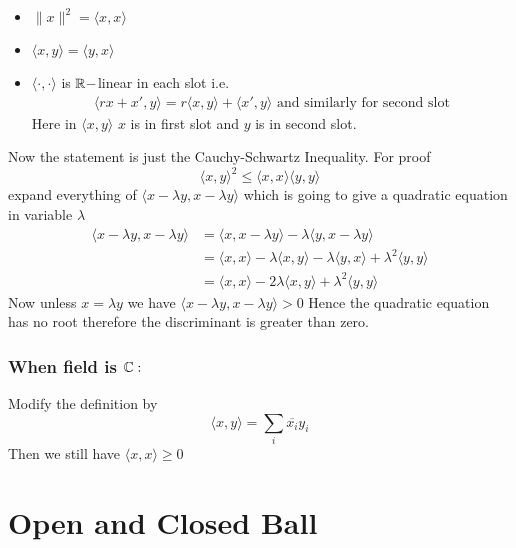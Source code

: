 {	\begin{note}
		\begin{itemize}
			\item $\|x\|^2=\langle x,x\rangle$
			\item $\langle x,y\rangle=\langle y,x\rangle$
			\item $\langle \cdot,\cdot\rangle$ is $\mathbb{R}-$linear in each slot i.e. \begin{align*}
				      \langle rx+x',y\rangle=r\langle x,y\rangle+\langle x',y\rangle	\text{ and similarly for second slot}
			      \end{align*}Here in $\langle x,y\rangle$ $x$ is in first slot and $y$ is in second slot.
		\end{itemize}
	\end{note}Now the statement is just the Cauchy-Schwartz Inequality. For proof $$\langle x,y\rangle^2\leq \langle x,x\rangle\langle y,y\rangle $$ expand everything of $\langle x-\lambda y,x-\lambda y\rangle$ which is going to give a quadratic equation in variable $\lambda $ \begin{align*}
		\langle x-\lambda y,x-\lambda y\rangle & =\langle x,x-\lambda y\rangle-\lambda\langle y,x-\lambda y\rangle                                       \\
		                                       & =\langle x ,x\rangle -\lambda\langle x,y\rangle -\lambda\langle y,x\rangle +\lambda^2\langle y,y\rangle \\
		                                       & =\langle x,x\rangle -2\lambda\langle x,y\rangle+\lambda^2\langle y,y\rangle
	\end{align*}Now unless $x=\lambda y$ we have $\langle x-\lambda y,x-\lambda y\rangle>0$ Hence the quadratic equation has no root therefore the discriminant is greater than zero.

	\subsubsection*{\textbf{When field is $\mathbb{C}:$}}Modify the definition by $$\langle x,y\rangle=\sum_i\overline{x_i}y_i$$Then we still have $\langle x,x\rangle\geq 0$}
\section{Open and Closed Ball}


